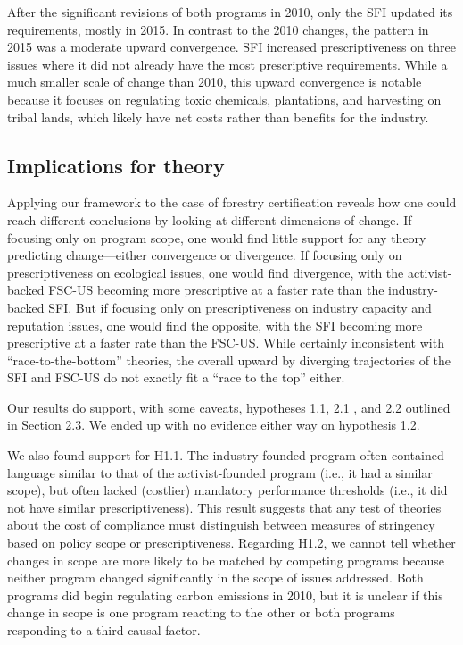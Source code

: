 \documentclass[
      12pt,
            Review ]{article}
\begin{document}
After the significant revisions of both programs in 2010, only the SFI
updated its requirements, mostly in 2015. In contrast to the 2010
changes, the pattern in 2015 was a moderate upward convergence. SFI
increased prescriptiveness on three issues where it did not already have
the most prescriptive requirements. While a much smaller scale of change
than 2010, this upward convergence is notable because it focuses on
regulating toxic chemicals, plantations, and harvesting on tribal lands,
which likely have net costs rather than benefits for the industry.

\subsection{Implications for theory}\label{implications-for-theory}

Applying our framework to the case of forestry certification reveals how
one could reach different conclusions by looking at different dimensions
of change. If focusing only on program scope, one would find little
support for any theory predicting change---either convergence or
divergence. If focusing only on prescriptiveness on ecological issues,
one would find divergence, with the activist-backed FSC-US becoming more
prescriptive at a faster rate than the industry-backed SFI. But if
focusing only on prescriptiveness on industry capacity and reputation
issues, one would find the opposite, with the SFI becoming more
prescriptive at a faster rate than the FSC-US. While certainly
inconsistent with ``race-to-the-bottom'' theories, the overall upward by
diverging trajectories of the SFI and FSC-US do not exactly fit a ``race
to the top'' either.

Our results do support, with some caveats, hypotheses 1.1, 2.1 , and 2.2
outlined in Section 2.3. We ended up with no evidence either way on
hypothesis 1.2.

We also found support for H1.1. The industry-founded program often
contained language similar to that of the activist-founded program
(i.e., it had a similar scope), but often lacked (costlier) mandatory
performance thresholds (i.e., it did not have similar prescriptiveness).
This result suggests that any test of theories about the cost of
compliance must distinguish between measures of stringency based on
policy scope or prescriptiveness. Regarding H1.2, we cannot tell whether
changes in scope are more likely to be matched by competing programs
because neither program changed significantly in the scope of issues
addressed. Both programs did begin regulating carbon emissions in 2010,
but it is unclear if this change in scope is one program reacting to the
other or both programs responding to a third causal factor.
\end{document}

